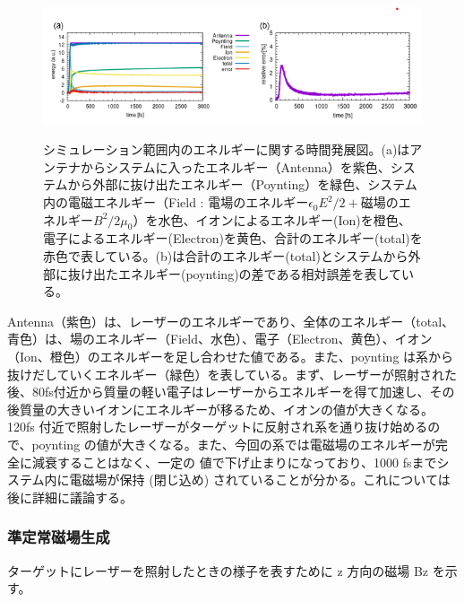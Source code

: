 \documentclass[a4paper,11pt,titlepage]{jarticle}
\numberwithin{equation}{section} %
\begin{document}
  \begin{figure}[H]
    \begin{center}
      \includegraphics[scale=0.5]{./image/4-7-2rod_dynamics.png}
      \label{fig:4-6}
      \caption{シミュレーション範囲内のエネルギーに関する時間発展図。(a)はアンテナからシステムに入ったエネルギー（Antenna）を紫色、システムから外部に抜け出たエネルギー（Poynting）を緑色、システム内の電磁エネルギー（Field : 電場のエネルギー$\epsilon_0E^{2}/2　+$磁場のエネルギー$B^{2}/2\mu_0$）を水色、イオンによるエネルギー(Ion)を橙色、電子によるエネルギー(Electron)を黄色、合計のエネルギー(total)を赤色で表している。(b)は合計のエネルギー(total)とシステムから外部に抜け出たエネルギー(poynting)の差である相対誤差を表している。}
    \end{center}
  \end{figure}
  
  Antenna（紫色）は、レーザーのエネルギーであり、全体のエネルギー（total、青色）は、場のエネルギー（Field、水色）、電子（Electron、黄色）、イオン（Ion、橙色）のエネルギーを足し合わせた値である。また、poynting は系から抜けだしていくエネルギー（緑色）を表している。まず、レーザーが照射された後、80fs付近から質量の軽い電子はレーザーからエネルギーを得て加速し、その後質量の大きいイオンにエネルギーが移るため、イオンの値が大きくなる。120fs 付近で照射したレーザーがターゲットに反射され系を通り抜け始めるので、poynting の値が大きくなる。また、今回の系では電磁場のエネルギーが完全に減衰することはなく、一定の
  値で下げ止まりになっており、1000 fsまでシステム内に電磁場が保持 (閉じ込め) されていることが分かる。これについては後に詳細に議論する。

  \subsubsection{準定常磁場生成}

  ターゲットにレーザーを照射したときの様子を表すために z 方向の磁場 Bz を示す。
  
\end{document}
